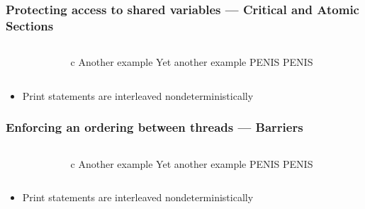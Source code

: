 \documentclass[handout]{beamer}
\begin{document}
\begin{frame}[fragile]
  \frametitle{Protecting access to shared variables --- Critical and Atomic Sections}
  \begin{columns}[t]%
    \begin{column}{0.65\textwidth}
    \end{column}
    \pause
    \begin{column}{0.4\textwidth}
      \begin{ccode}[]
        {c}
        Another example
        Yet another example
        PENIS
        PENIS
      \end{ccode}
    \end{column}
  \end{columns}
  \pause
  \begin{itemize}
  \item Print statements are interleaved nondeterministically
  \end{itemize}
\end{frame}



\begin{frame}[fragile]
  \frametitle{Enforcing an ordering between threads --- Barriers}
  \begin{columns}[t]%
    \begin{column}{0.65\textwidth}
    \end{column}
    \pause
    \begin{column}{0.4\textwidth}
      \begin{ccode}[]
        {c}
        Another example
        Yet another example
        PENIS
        PENIS
      \end{ccode}
    \end{column}
  \end{columns}
  \pause
  \begin{itemize}
  \item Print statements are interleaved nondeterministically
  \end{itemize}
\end{frame}
\end{document}

